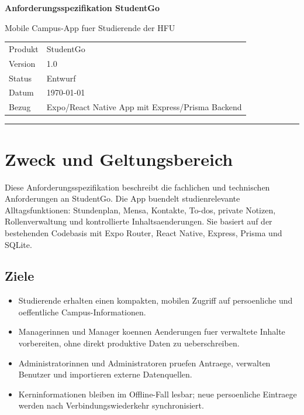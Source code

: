 \documentclass[11pt,a4paper]{article}
\newcommand{\docTitle}{Anforderungsspezifikation StudentGo}
\newcommand{\version}{1.0}
\newcommand{\status}{Entwurf}
\newcommand{\product}{StudentGo}
\begin{document}
\begin{titlepage}
  \centering
  \vspace*{18mm}
  {\Huge\bfseries \docTitle\par}
  \vspace{8mm}
  {\Large Mobile Campus-App fuer Studierende der HFU\par}
  \vfill
  \begin{tabular}{ll}
    Produkt & \product\\
    Version & \version\\
    Status & \status\\
    Datum & \today\\
    Bezug & Expo/React Native App mit Express/Prisma Backend
  \end{tabular}
  \vfill
  {\color{brand}\rule{0.7\textwidth}{1.2pt}}
\end{titlepage}

\tableofcontents
\newpage

\section{Zweck und Geltungsbereich}
Diese Anforderungsspezifikation beschreibt die fachlichen und technischen Anforderungen an \product. Die App buendelt studienrelevante Alltagsfunktionen: Stundenplan, Mensa, Kontakte, To-dos, private Notizen, Rollenverwaltung und kontrollierte Inhaltsaenderungen. Sie basiert auf der bestehenden Codebasis mit Expo Router, React Native, Express, Prisma und SQLite.

\subsection{Ziele}
\begin{itemize}
  \item Studierende erhalten einen kompakten, mobilen Zugriff auf persoenliche und oeffentliche Campus-Informationen.
  \item Managerinnen und Manager koennen Aenderungen fuer verwaltete Inhalte vorbereiten, ohne direkt produktive Daten zu ueberschreiben.
  \item Administratorinnen und Administratoren pruefen Antraege, verwalten Benutzer und importieren externe Datenquellen.
  \item Kerninformationen bleiben im Offline-Fall lesbar; neue persoenliche Eintraege werden nach Verbindungswiederkehr synchronisiert.
\end{itemize}
\end{document}
